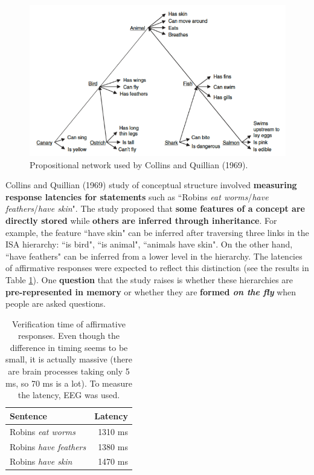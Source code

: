 \begin{figure}
    \centering
    \includegraphics[width=0.7\linewidth]{images/animal_pn.png}
    \caption{Propositional network used by Collins and Quillian (1969).}
    \label{fig:animal_pn}
\end{figure}
Collins and Quillian (1969) study of conceptual structure involved \textbf{measuring response latencies for statements} such as ``Robins \textit{eat worms}/\textit{have feathers}/\textit{have skin}". The study proposed that \textbf{some features of a concept are directly stored} while \textbf{others are inferred through inheritance}. For example, the feature ``have skin" can be inferred after traversing three links in the ISA hierarchy: ``is bird", ``is animal", ``animals have skin". On the other hand, ``have feathers" can be inferred from a lower level in the hierarchy.
The latencies of affirmative responses were expected to reflect this distinction (see the results in Table \ref{tab:collins}). One \textbf{question} that the study raises is whether these hierarchies are \textbf{pre-represented in memory} or whether they are \textbf{formed \textit{on the fly}} when people are asked questions.\\

\begin{table}[t]
    \centering
    \captionsetup{width=.8\linewidth}
    \begin{tabular}{lr}
        \hline
        Sentence & Latency \\
        \hline
        Robins \textit{eat worms} & 1310 ms \\
        Robins \textit{have feathers} & 1380 ms \\
        Robins \textit{have skin} & 1470 ms \\
        \hline
    \end{tabular}
    \caption{Verification time of affirmative responses. Even though the difference in timing seems to be small, it is actually massive (there are brain processes taking only 5 ms, so 70 ms is a lot). To measure the latency, EEG was used.}
    \label{tab:collins}
\end{table}

